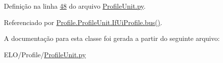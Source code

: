 Definição na linha \hyperlink{ProfileUnit_8py_source_l00048}{48} do arquivo \hyperlink{ProfileUnit_8py_source}{Profile\-Unit.\-py}.



Referenciado por \hyperlink{classProfile_1_1ProfileUnit_1_1IfUiProfile_ac3d0a7a780dcf729b9f3cf1fff243a78}{Profile.\-Profile\-Unit.\-If\-Ui\-Profile.\-bus()}.



A documentação para esta classe foi gerada a partir do seguinte arquivo\-:\begin{DoxyCompactItemize}
\item 
E\-L\-O/\-Profile/\hyperlink{ProfileUnit_8py}{Profile\-Unit.\-py}\end{DoxyCompactItemize}
